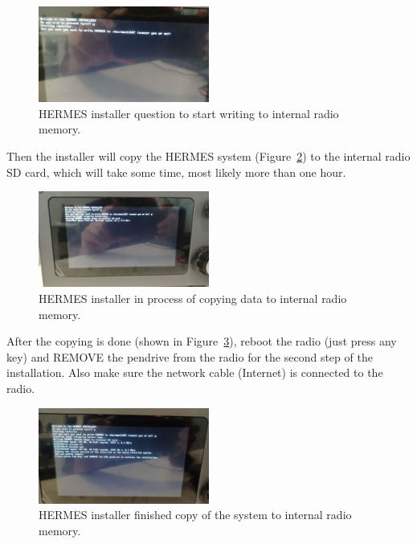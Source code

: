 \documentclass[11pt,a4paper]{article}
\begin{document}
\begin{figure}[H]
  \centering
  \includegraphics[width=0.5\textwidth]{pictures/inst-2.jpg}
  \caption{HERMES installer question to start writing to internal radio memory.}
  \label{fig:inst2}
\end{figure}

Then the installer will copy the HERMES system (Figure~\ref{fig:inst3}) to the internal radio SD card, which will take some time, most likely more than one hour.

\begin{figure}[H]
  \centering
  \includegraphics[width=0.5\textwidth]{pictures/inst-3.jpg}
  \caption{HERMES installer in process of copying data to internal radio memory.}
  \label{fig:inst3}
\end{figure}

After the copying is done (shown in Figure~\ref{fig:inst4}), reboot the radio (just press any key) and REMOVE the pendrive from the radio
for the second step of the installation. Also make sure the network cable (Internet) is connected to the radio.

\begin{figure}[H]
  \centering
  \includegraphics[width=0.5\textwidth]{pictures/inst-4.jpg}
  \caption{HERMES installer finished copy of the system to internal radio memory.}
  \label{fig:inst4}
\end{figure}
\end{document}
